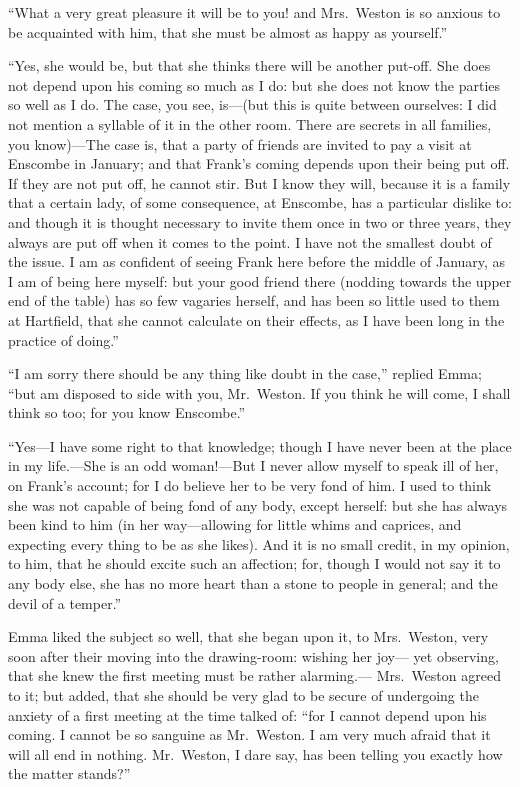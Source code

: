 ``What a very great pleasure it will be to you! and Mrs.\ Weston
is so anxious to be acquainted with him, that she must be almost
as happy as yourself.''

``Yes, she would be, but that she thinks there will be another
put-off. She does not depend upon his coming so much as I do:
but she does not know the parties so well as I do.  The case,
you see, is---(but this is quite between ourselves:  I did not mention
a syllable of it in the other room.  There are secrets in all families,
you know)---The case is, that a party of friends are invited to pay
a visit at Enscombe in January; and that Frank's coming depends upon
their being put off.  If they are not put off, he cannot stir.
But I know they will, because it is a family that a certain lady,
of some consequence, at Enscombe, has a particular dislike to:
and though it is thought necessary to invite them once in two or
three years, they always are put off when it comes to the point.
I have not the smallest doubt of the issue.  I am as confident
of seeing Frank here before the middle of January, as I am
of being here myself:  but your good friend there (nodding
towards the upper end of the table) has so few vagaries herself,
and has been so little used to them at Hartfield, that she cannot
calculate on their effects, as I have been long in the practice
of doing.''

``I am sorry there should be any thing like doubt in the case,''
replied Emma; ``but am disposed to side with you, Mr.\ Weston.  If you
think he will come, I shall think so too; for you know Enscombe.''

``Yes---I have some right to that knowledge; though I have never been
at the place in my life.---She is an odd woman!---But I never allow
myself to speak ill of her, on Frank's account; for I do believe
her to be very fond of him.  I used to think she was not capable
of being fond of any body, except herself:  but she has always been
kind to him (in her way---allowing for little whims and caprices,
and expecting every thing to be as she likes). And it is no small credit,
in my opinion, to him, that he should excite such an affection;
for, though I would not say it to any body else, she has no more
heart than a stone to people in general; and the devil of a temper.''

Emma liked the subject so well, that she began upon it, to Mrs.\ Weston,
very soon after their moving into the drawing-room: wishing her joy---%
yet observing, that she knew the first meeting must be rather alarming.---%
Mrs.\ Weston agreed to it; but added, that she should be very
glad to be secure of undergoing the anxiety of a first meeting
at the time talked of:  ``for I cannot depend upon his coming.
I cannot be so sanguine as Mr.\ Weston.  I am very much afraid
that it will all end in nothing.  Mr.\ Weston, I dare say, has been
telling you exactly how the matter stands?''

